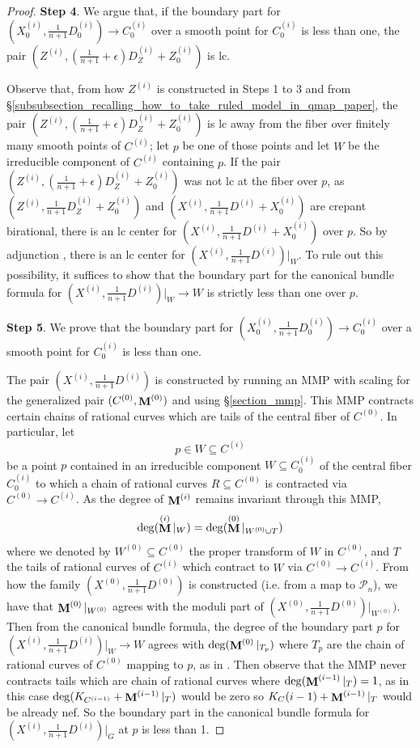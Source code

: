 \documentclass[a4paper,12pt]{amsart}
\newcommand{\sP}{{\mathscr{P}}}
\DeclareMathOperator{\bfM}{{\bf{M}}}
\theoremstyle{definition}
\theoremstyle{remark}
\begin{document}
\begin{proof}
     \textbf{Step 4}. We argue that, if the boundary part for $(X^{(i)}_0,\frac{1}{n+1}D^{(i)}_0)\to C^{(i)}_0$ over a smooth point for $C^{(i)}_0$ is less than one, the pair $(Z^{(i)},(\frac{1}{n+1} +\epsilon)D_Z^{(i)} + Z^{(i)}_0)$ is lc.
     
     
     Observe that, from how $Z^{(i)}$ is constructed in Steps 1 to 3 and from \S \ref{subsubsection_recalling_how_to_take_ruled_model_in_qmap_paper}, the pair $(Z^{(i)},(\frac{1}{n+1} +\epsilon)D_Z^{(i)} + Z^{(i)}_0)$ is lc away from the fiber over finitely many smooth points of $C^{(i)}$; let $p$ be one of those points and let $W$ be the irreducible component of $C^{(i)}$ containing $p$.
     If the pair $(Z^{(i)},(\frac{1}{n+1} +\epsilon)D_Z^{(i)} + Z^{(i)}_0)$ was not lc at the fiber over $p$, as $(Z^{(i)},\frac{1}{n+1}D_Z^{(i)} + Z^{(i)}_0)$ and $(X^{(i)},\frac{1}{n+1}D^{(i)}+X^{(i)}_0)$ are crepant birational, there is an lc center for $(X^{(i)},\frac{1}{n+1} D^{(i)} + X^{(i)}_0)$ over $p$. So by adjunction \cite[Theorem 4.9]{Kol13}, there is an lc center for $(X^{(i)},\frac{1}{n+1} D^{(i)})|_W$. To rule out this possibility, it suffices to show that the boundary part for the canonical bundle formula for $(X^{(i)},\frac{1}{n+1} D^{(i)})|_W\to W$ is strictly less than one over $p$.
     
     
     \textbf{Step 5}. We prove that the boundary part for $(X^{(i)}_0,\frac{1}{n+1}D^{(i)}_0)\to C^{(i)}_0$ over a smooth point for $C^{(i)}_0$ is less than one.

     
     The pair $(X^{(i)},\frac{1}{n+1}D^{(i)})$ is constructed by running an MMP with scaling for the generalized pair $(C^{(0)},\bfM^{(0)})$ and using \S\ref{section_mmp}.
     This MMP contracts certain chains of rational curves which are tails of the central fiber of $C^{(0)}$. In particular, let \[p\in W\subseteq C^{(i)}\] be a point $p$ contained in an irreducible component $ W\subseteq C^{(i)}_0$ of the central fiber $C^{(i)}_0$ to which a chain of rational curves $R\subseteq C^{(0)}$ is contracted via $C^{(0)}\to C^{(i)}$.
     As the degree of $\bfM^{(i)}$ remains invariant through this MMP,
     \[
     \deg(\bfM^{(i)}|_{W}) =\deg(\bfM^{(0)}|_{W^{(0)}\cup T}) 
     \]
     where we denoted by $W^{(0)}\subseteq C^{(0)}$ the proper transform of $W$ in $C^{(0)}$, and $T$ the tails of rational curves of $C^{(i)}$ which contract to $W$ via $C^{(0)}\to C^{(i)}$. From how the family $(X^{(0)},\frac{1}{n+1}D^{(0)})$ is constructed (i.e. from a map to $\sP_n$), we have that $\bfM^{(0)}|_{W^{(0)}}$ agrees with the moduli part
     of $(X^{(0)},\frac{1}{n+1}D^{(0)})|_{W^{(0)}})$. Then from the canonical bundle formula, the degree of the {boundary} part $p$ for $(X^{(i)},\frac{1}{n+1}D^{(i)})|_W\to W$ agrees with $\deg(\bfM^{(0)}|_{ T_p})$ where $T_p$ are the chain of rational curves of $C^{(0)}$ mapping to $p$, as in .    
     Then observe that the MMP never contracts tails which are chain of rational curves where $\deg(\bfM^{(i-1)}|_{ T})=1$, as in this case $\deg(K_{C^{(i-1)}}+\bfM^{(i-1)}|_{ T})$ would be zero so $K_C{(i-1)}+\bfM^{(i-1)}|_{ T}$ would be already nef. So the boundary part in the canonical bundle formula for $(X^{(i)},\frac{1}{n+1}D^{(i)})|_G$ at $p$ is less than 1.


\end{proof}
\end{document}
